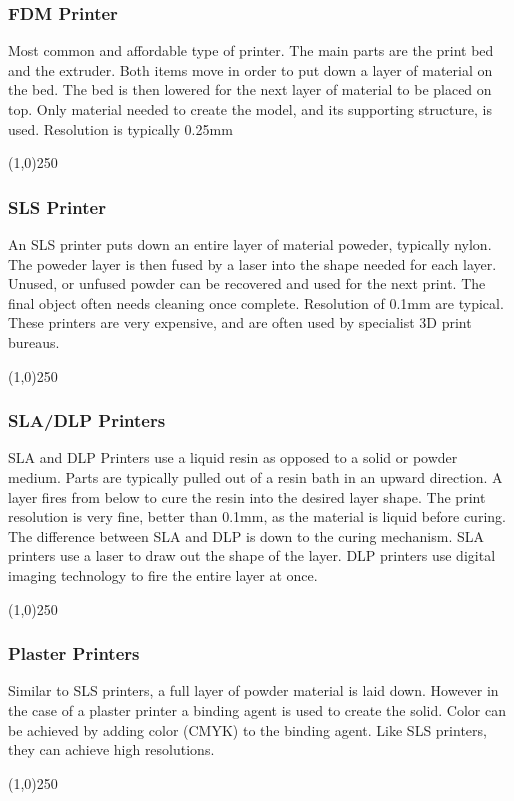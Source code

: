 \begin{frame}
\frametitle{FDM Printer}
Most common and affordable type of printer.  The main parts are the print bed and the extruder.  Both items move in order to put down a layer of material on the bed. The bed is then lowered for the next layer of material to be placed on top.  Only material needed to create the model, and its supporting structure, is used.  Resolution is typically 0.25mm
\end{frame}
\begin{center}\line(1,0){250}\end{center}



\begin{frame}
\frametitle{SLS Printer}
An SLS printer puts down an entire layer of material poweder, typically nylon.  The poweder layer is then fused by a laser into the shape needed for each layer.  Unused, or unfused powder can be recovered and used for the next print.  The final object often needs cleaning once complete.  Resolution of 0.1mm are typical.  These printers are very expensive, and are often used by specialist 3D print bureaus.
\end{frame}
\begin{center}\line(1,0){250}\end{center}


\begin{frame}
\frametitle{SLA/DLP Printers}
SLA and DLP Printers use a liquid resin as opposed to a solid or powder medium.  Parts are typically pulled out of a resin bath in an upward direction.  A layer fires from below to cure the resin into the desired layer shape.  The print resolution is very fine, better than 0.1mm, as the material is liquid before curing.\\
The difference between SLA and DLP is down to the curing mechanism.  SLA printers use a laser to draw out the shape of the layer.  DLP printers use digital imaging technology to fire the entire layer at once.

\end{frame}
\begin{center}\line(1,0){250}\end{center}


\begin{frame}
\frametitle{Plaster Printers}
Similar to SLS printers, a full layer of powder material is laid down.  However in the case of a plaster printer a binding agent is used to create the solid.  Color can be achieved by adding color (CMYK) to the binding agent.  Like SLS printers, they can achieve high resolutions.
\end{frame}
\begin{center}\line(1,0){250}\end{center}


